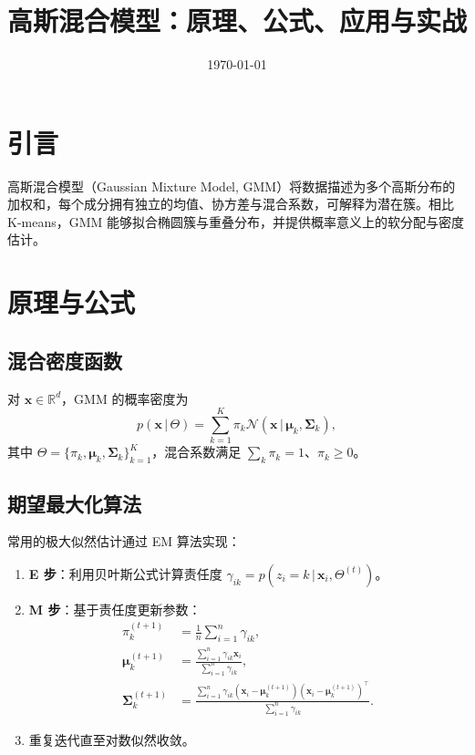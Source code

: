\documentclass[UTF8,zihao=-4]{ctexart}
\title{高斯混合模型：原理、公式、应用与实战}
\author{}
\date{\today}
\begin{document}
\maketitle

\section{引言}
高斯混合模型（Gaussian Mixture Model, GMM）将数据描述为多个高斯分布的加权和，每个成分拥有独立的均值、协方差与混合系数，可解释为潜在簇。相比 K-means，GMM 能够拟合椭圆簇与重叠分布，并提供概率意义上的软分配与密度估计。

\section{原理与公式}
\subsection{混合密度函数}
对 \(\mathbf{x} \in \mathbb{R}^d\)，GMM 的概率密度为
\begin{equation}
p(\mathbf{x}\,|\,\Theta) = \sum_{k=1}^K \pi_k \mathcal{N}(\mathbf{x} \,|\, \bm{\mu}_k, \mathbf{\Sigma}_k),
\end{equation}
其中 \(\Theta = \{\pi_k, \bm{\mu}_k, \mathbf{\Sigma}_k\}_{k=1}^K\)，混合系数满足 \(\sum_k \pi_k = 1\)、\(\pi_k \ge 0\)。

\subsection{期望最大化算法}
常用的极大似然估计通过 EM 算法实现：
\begin{enumerate}
  \item \textbf{E 步}：利用贝叶斯公式计算责任度 \(\gamma_{ik} = p(z_i = k \,|\, \mathbf{x}_i, \Theta^{(t)})\)。
  \item \textbf{M 步}：基于责任度更新参数：
  \begin{align}
  \pi_k^{(t+1)} &= \frac{1}{n} \sum_{i=1}^n \gamma_{ik},\\
  \bm{\mu}_k^{(t+1)} &= \frac{\sum_{i=1}^n \gamma_{ik} \mathbf{x}_i}{\sum_{i=1}^n \gamma_{ik}},\\
  \mathbf{\Sigma}_k^{(t+1)} &= \frac{\sum_{i=1}^n \gamma_{ik} (\mathbf{x}_i - \bm{\mu}_k^{(t+1)})(\mathbf{x}_i - \bm{\mu}_k^{(t+1)})^\top}{\sum_{i=1}^n \gamma_{ik}}.
  \end{align}
  \item 重复迭代直至对数似然收敛。
\end{enumerate}
\end{document}
